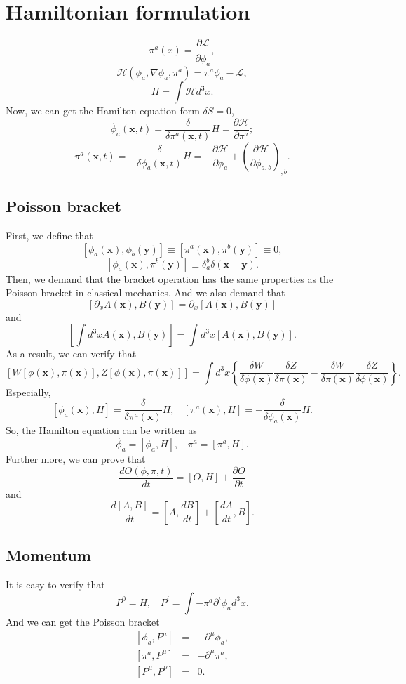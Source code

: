 \section{Hamiltonian formulation}
\[\pi^a(x) = \frac{\partial \mathcal{L}}{\partial \dot{\phi_a}},\]
\[\mathcal{H}(\phi_a,\nabla \phi_a,\pi^a) = \pi^a \dot{\phi_a} - \mathcal{L},\]
\[H = \int \mathcal{H} d^3 x.\]
Now, we can get the Hamilton equation form $\delta S =0$,
\[\dot{\phi_a}(\bm{x},t) = \frac{\delta}{\delta \pi^a(\bm{x},t)} H = \frac{\partial \mathcal{H}}{\partial \pi^a};\]
\[\dot{\pi^a}(\bm{x},t) = -\frac{\delta}{\delta \phi_a(\bm{x},t)} H = - \frac{\partial \mathcal{H}}{\partial \phi_a} + \left(\frac{\partial \mathcal{H}}{\partial \phi_{a,b}}\right)_{,b}.\]

\subsection{Poisson bracket}

First, we define that
\[[\phi_a(\bm{x}),\phi_b(\bm{y})] \equiv [\pi^a(\bm{x}),\pi^b(\bm{y})] \equiv 0,\]
\[[\phi_a(\bm{x}),\pi^b(\bm{y})] \equiv \delta^{b}_{a} \delta(\bm{x}-\bm{y}).\]
Then, we demand that the bracket operation has the same properties as the Poisson bracket in classical mechanics. And we also demand that
\[[\partial_x A(\bm{x}),B(\bm{y})] = \partial_x [A(\bm{x}),B(\bm{y})]\]
and
\[\left[\int d^3 x A(\bm{x}),B(\bm{y})\right] = \int d^3 x [A(\bm{x}),B(\bm{y})].\]
As a result, we can verify that
\[[W[\phi(\bm{x}),\pi(\bm{x})],Z[\phi(\bm{x}),\pi(\bm{x})]] = \int d^3x \left\{ \frac{\delta W}{\delta \phi(\bm{x})} \frac{\delta Z}{\delta \pi(\bm{x})} - \frac{\delta W}{\delta \pi(\bm{x})} \frac{\delta Z}{\delta \phi(\bm{x})} \right\}.\]
Especially,
\[[\phi_a(\bm{x}),H] = \frac{\delta }{\delta \pi^a(\bm{x})} H, \ \ \ \ [\pi^a(\bm{x}),H] = -\frac{\delta }{\delta \phi_a(\bm{x})} H.\]
So, the Hamilton equation can be written as
\[\dot{\phi_a} = [\phi_a,H], \ \ \ \ \dot{\pi^a} = [\pi^a,H].\]
Further more, we can prove that
\[\frac{dO(\phi,\pi,t)}{dt} = [O,H] + \frac{\partial O}{\partial t} \]
and
\[\frac{d[A,B]}{dt} = [A,\frac{dB}{dt}] + [\frac{dA}{dt},B]  .\]

\subsection{Momentum}

It is easy to verify that
\[P^{0} = H, \ \ \ \ P^{i} = \int -\pi^a \partial^i \phi_a d^3 x.\]
And we can get the Poisson bracket
\begin{eqnarray}
	\left[\phi_a,P^{\mu}\right] &=& -\partial^{\mu} \phi_a, \nonumber \\
	\left[\pi^a,P^{\mu}\right] &=& -\partial^{\mu} \pi^a, \nonumber \\
	\left[P^{\mu},P^{\nu}\right] &=& 0 .\nonumber 
\end{eqnarray}

